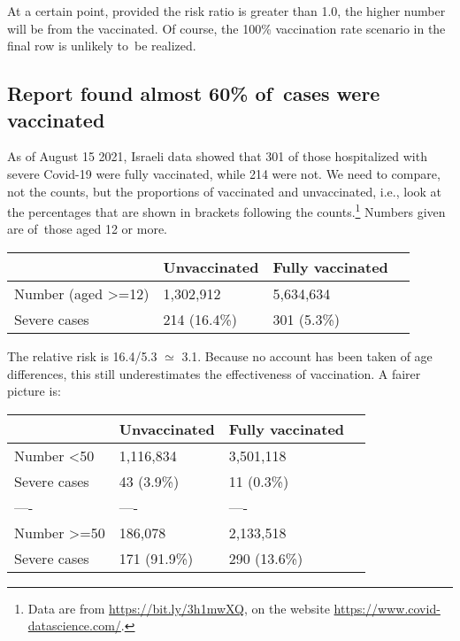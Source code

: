 \documentclass[
  10ptls,
  b5paper]{book}
\begin{document}
At a certain point, provided the risk ratio is greater than 1.0, the higher number will be from the vaccinated. Of course, the 100\% vaccination rate scenario in the final row is unlikely to~be realized.

\hypertarget{report-found-almost-60-of-cases-were-vaccinated}{%
\subsection*{Report found almost 60\% of~cases were vaccinated}\label{report-found-almost-60-of-cases-were-vaccinated}}

As of August 15 2021, Israeli data showed that 301 of those hospitalized with severe Covid-19 were fully vaccinated, while 214 were not. We need to compare, not the counts, but the proportions of vaccinated and unvaccinated, i.e., look at the percentages that are shown in brackets following the counts.\footnote{Data are from \url{https://bit.ly/3h1mwXQ}, on the website \url{https://www.covid-datascience.com/}.} Numbers given are of~those aged 12 or more.

\begin{longtable}[]{@{}llll@{}}
\toprule\noalign{}
& Unvaccinated & Fully vaccinated & \\
\midrule\noalign{}
\endhead
\bottomrule\noalign{}
\endlastfoot
Number (aged \textgreater=12) & 1,302,912 & 5,634,634 & \\
Severe cases & 214 (16.4\%) & 301 (5.3\%) & \\
\end{longtable}

The relative risk is 16.4/5.3 \(\simeq\) 3.1. Because no account has been taken of age differences, this still underestimates the effectiveness of vaccination. A fairer picture is:

\begin{longtable}[]{@{}llll@{}}
\toprule\noalign{}
& Unvaccinated & Fully vaccinated & \\
\midrule\noalign{}
\endhead
\bottomrule\noalign{}
\endlastfoot
Number \textless50 & 1,116,834 & 3,501,118 & \\
Severe cases & 43 (3.9\%) & 11 (0.3\%) & \\
---- & ---- & ---- & \\
Number \textgreater=50 & 186,078 & 2,133,518 & \\
Severe cases & 171 (91.9\%) & 290 (13.6\%) & \\
\end{longtable}
\end{document}
